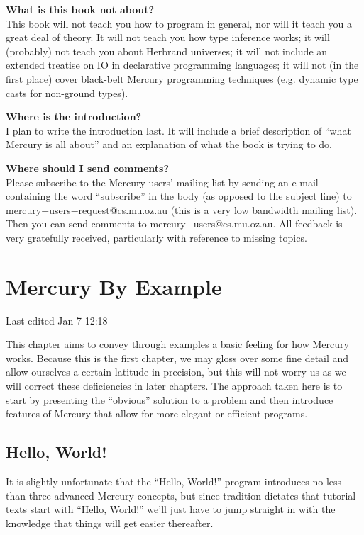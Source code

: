 \documentclass[a4paper,11pt,notitlepage,onecolumn]{book}
\begin{document}
\textbf{What is this book not about?}
\\
This book will not teach you how to program in general, nor will it teach
you a great deal of theory.  It will not teach you how type inference works;
it will (probably) not teach you about Herbrand universes; it will not
include an extended treatise on IO in declarative programming languages; it
will not (in the first place) cover black-belt Mercury programming
techniques (e.g. dynamic type casts for non-ground types).

\textbf{Where is the introduction?}
\\
I plan to write the introduction last.  It will include a brief description
of ``what Mercury is all about'' and an explanation of what the book is
trying to do.

\textbf{Where should I send comments?}
\\
Please subscribe to the Mercury users' mailing list by sending an e-mail
containing the word ``subscribe'' in the body (as opposed to the subject
line) to \textsf{mercury{\ensuremath{-}}users{\ensuremath{-}}request@cs.mu.oz.au} (this is a very low bandwidth
mailing list).  Then you can send comments to \textsf{mercury{\ensuremath{-}}users@cs.mu.oz.au}.
All feedback is very gratefully received, particularly with reference to
missing topics.
\setcounter{chapter}{0}

\chapter{Mercury By Example}

Last edited Jan 7 12:18

This chapter aims to convey through examples a basic feeling for how
Mercury works.  Because this is the first chapter, we may gloss over some
fine detail and allow ourselves a certain latitude in precision, but this
will not worry us as we will correct these deficiencies in later chapters.
The approach taken here is to start by presenting the ``obvious'' solution
to a problem and then introduce features of Mercury that allow for more
elegant or efficient programs.



\section{Hello, World!}

It is slightly unfortunate that the ``Hello, World!'' program introduces
no less than three advanced Mercury concepts, but since tradition
dictates that tutorial texts start with ``Hello, World!'' we'll just
have to jump straight in with the knowledge that things will get easier
thereafter.
\end{document}
